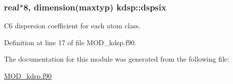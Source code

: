 \hypertarget{classkdsp_aba76ed1bb9b7b80e0f4549d0028f82c8}{
\subsubsection[{dspsix}]{\setlength{\rightskip}{0pt plus 5cm}real$\ast$8, dimension(maxtyp) kdsp\-::dspsix}}\label{classkdsp_aba76ed1bb9b7b80e0f4549d0028f82c8}


C6 dispersion coefficient for each atom class. 



Definition at line 17 of file M\-O\-D\-\_\-kdsp.\-f90.



The documentation for this module was generated from the following file\-:\begin{DoxyCompactItemize}
\item 
\hyperlink{MOD__kdsp_8f90}{M\-O\-D\-\_\-kdsp.\-f90}\end{DoxyCompactItemize}
